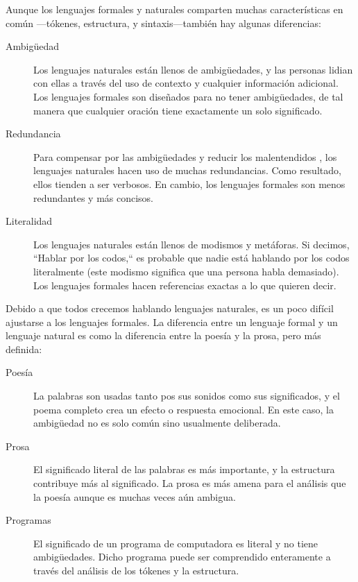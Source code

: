 Aunque los lenguajes formales y naturales comparten muchas características en común
---tókenes, estructura, y sintaxis---también hay algunas diferencias:

\begin{description}

\item[Ambigüedad] Los lenguajes naturales están llenos de ambigüedades,
y las personas lidian con ellas a través del uso de contexto y cualquier
información adicional. Los lenguajes formales son diseñados para no tener
ambigüedades, de tal manera que cualquier oración tiene exactamente un solo
significado.

\item[Redundancia] Para compensar por las ambigüedades y reducir los malentendidos
, los lenguajes naturales hacen uso de muchas redundancias. Como resultado,
ellos tienden a ser verbosos. En cambio, los lenguajes formales son menos
redundantes y más concisos.

\item[Literalidad] Los lenguajes naturales están llenos de modismos
y metáforas. Si decimos, ``Hablar por los codos,`` es probable que nadie
está hablando por los codos literalmente (este modismo significa que una persona
habla demasiado). Los lenguajes formales hacen referencias exactas a lo que quieren
decir.

\end{description}

Debido a que todos crecemos hablando lenguajes naturales, es un poco 
difícil ajustarse a los lenguajes formales. La diferencia entre un lenguaje formal
y un lenguaje natural es como la diferencia entre la poesía y la prosa, pero
más definida:  

\begin{description}

\item[Poesía] La palabras son usadas tanto pos sus sonidos como
sus significados, y el poema completo crea un efecto o respuesta
emocional. En este caso, la ambigüedad no es solo común sino usualmente
deliberada. 

\item[Prosa] El significado literal de las palabras es más importante, y la estructura
contribuye más al significado. La prosa es más amena para el análisis que la poesía
aunque es muchas veces aún ambigua.

\item[Programas] El significado de un programa de computadora es literal y 
no tiene ambigüedades. Dicho programa puede ser comprendido enteramente a través
del análisis de los tókenes y la estructura.

\end{description}

